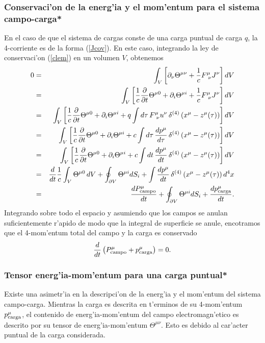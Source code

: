 \subsubsection{Conservaci'on de la energ'ia y el mom'entum para el sistema
campo-carga*}

En el caso de que el sistema de cargas conste de una carga puntual de carga $q$,
la 4-corriente es de la forma (\ref{Jcov}). En este caso, integrando la ley de
conservaci'on (\ref{clem}) en un volumen $V$, obtenemos
\begin{eqnarray}
0&=&\int_V \left[ \partial_\nu \Theta^{\mu\nu}+\frac{1}{c} F^\mu_{\
\nu}J^\nu\right]  dV \\
&=&\int_V \left[\frac{1}{c} \frac{\partial}{\partial t} \Theta^{\mu
0}+\partial_i \Theta^{\mu i}+\frac{1}{c} F^\mu_{\ \nu}J^\nu\right]  dV \\
&=&\int_V \left[\frac{1}{c} \frac{\partial}{\partial t} \Theta^{\mu
0}+\partial_i \Theta^{\mu i}+q\int d\tau\,  F^\mu_{\
\nu}u^\nu\,\delta^{(4)}\left(x^\mu-z^\mu(\tau)\right)\right]  dV \\
&=&\int_V \left[\frac{1}{c} \frac{\partial}{\partial t} \Theta^{\mu
0}+\partial_i \Theta^{\mu i}+c\int d\tau\,
\frac{dp^\mu}{d\tau}\,\delta^{(4)}\left(x^\mu-z^\mu(\tau)\right)\right]  dV \\
&=&\int_V \left[\frac{1}{c} \frac{\partial}{\partial t} \Theta^{\mu
0}+\partial_i \Theta^{\mu i}+c\int dt\,
\frac{dp^\mu}{dt}\,\delta^{(4)}\left(x^\mu-z^\mu(\tau)\right)\right]  dV
\\
&=&\frac{d}{dt}\frac{1}{c}\int_V  \Theta^{\mu 0}\,dV+\oint_{\partial V}\Theta^{\mu
i}dS_i+\int \frac{dp^\mu}{dt}\,\delta^{(4)}\left(x^\mu-z^\mu(\tau)\right)  d^4x
\\
&=&\frac{dP^\mu_{\rm campo}}{dt}+\oint_{\partial V}\Theta^{\mu
i}dS_i+\frac{dp^\mu_{\rm carga}}{dt}.
\end{eqnarray}
Integrando sobre todo el espacio y asumiendo que los campos se anulan
suficientemente r'apido de modo que la integral de superficie se anule,
encotramos que el 4-mom'entum total del campo y la carga es conservado
\begin{equation}
\frac{d}{dt}\left( P^\mu_{\rm campo}+p^\mu_{\rm carga}\right) =0.
\end{equation}

\subsubsection{Tensor energ'ia-mom'entum para una carga puntual*}
Existe una asimetr'ia en la descripci'on de la energ'ia y el mom'entum del
sistema campo-carga. Mientras la carga es descrita en t'erminos de su 4-mom'entum
$p^\mu_{\rm carga}$, el contenido de energ'ia-mom'entum del campo
electromagn'etico es descrito por su tensor de energ'ia-mom'entum
$\Theta^{\mu\nu}$. Esto es debido al car'acter puntual de la carga considerada.

